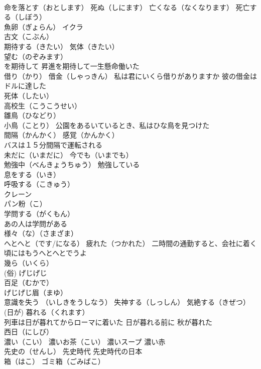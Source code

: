 \documentclass[8pt]{extreport}
\begin{document}
\begin{CJK}{UTF8}{min}
\\	命を落とす（おとします） 死ぬ（しにます） 亡くなる（なくなります） 死亡する（しぼう）
\\	魚卵（ぎょらん） イクラ
\\	古文（こぶん）
\\	期待する（きたい） 気体（きたい） 
\\	望む（のぞみます）
\\	を期待して 昇進を期待して一生懸命働いた
\\	借り（かり） 借金（しゃっきん） 私は君にいくら借りがありますか 彼の借金はドルに達した
\\	死体（したい）
\\	高校生（こうこうせい）
\\	雛鳥（ひなどり） 
\\	小鳥（ことり） 公園をあるいているとき、私はひな鳥を見つけた
\\	間隔（かんかく） 感覚（かんかく） 
\\	バスは１５分間隔で運転される
\\	未だに（いまだに） 今でも（いまでも）
\\	勉強中（べんきょうちゅう） 勉強している
\\	息をする（いき） 
\\	呼吸する（こきゅう）
\\	クレーン
\\	パン粉（こ）
\\	学問する（がくもん） 
\\	あの人は学問がある
\\	様々（な）（さまざま）
\\	へとへと（です/になる） 疲れた（つかれた） 二時間の通勤すると、会社に着く頃にはもうへとへとでうよ
\\	幾ら（いくら）
\\	(俗)	げじげじ 
\\	百足（むかで） 
\\	げじげじ眉（まゆ）
\\	意識を失う （いしきをうしなう） 失神する（しっしん） 気絶する（きぜつ）
\\	(日が) 暮れる（くれます） 
\\	列車は日が暮れてからローマに着いた 日が暮れる前に 秋が暮れた
\\	西日（にしび）
\\	濃い（こい） 濃いお茶（こい） 濃いスープ 濃い赤
\\	先史の（せんし） 先史時代 先史時代の日本
\\	箱（はこ） ゴミ箱（ごみばこ）

\end{CJK}
\end{document}
